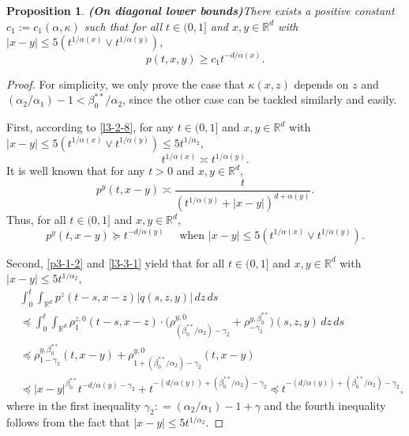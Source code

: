 \documentclass[a4paper,11pt]{amsart}
\renewcommand{\le}{\leqslant}
\renewcommand{\ge}{\geqslant}
\newcommand{\R}{\mathds R}
\newcommand{\B}{\beta}
\newcommand{\p}{\preceq}
\newcommand{\K}{\kappa}
\newcommand{\A}{\alpha}
\newcommand{\G}{\gamma}
\newtheorem{proposition}[theorem]{Proposition}
\theoremstyle{definition}
\begin{document}
\begin{proposition}{\bf (On diagonal lower bounds)}\label{p4-3}
There exists a positive constant $c_1:=c_1(\A,\K)$ such that for all $t \in (0,1]$ and $x,y \in \R^d$ with $|x-y|\le 5
(t^{{1}/{\A(x)}}\vee t^{{1}/{\A(y)}})$,
\begin{equation}\label{p4-3-1}
p(t,x,y) \ge c_1t^{-{d}/{\A(x)}}.
\end{equation}
\end{proposition}
\begin{proof}
For simplicity, we only prove the case that $\K(x,z)$ depends on $z$ and $({\A_2}/{\A_1})-1<\B_0^{**}/{\A_2}$, since the other case can be
tackled similarly and easily.

First, according to \eqref{l3-2-8}, for any $t\in(0,1]$ and $x,y\in\R^d$ with $|x-y|\le 5
(t^{{1}/{\A(x)}}\vee t^{{1}/{\A(y)}})\le 5t^{{1}/{\A_2}}$,
\begin{equation}\label{p4-3-2}
t^{{1}/{\A(x)}}\asymp t^{{1}/{\A(y)}}.
\end{equation}
It is well known that for any $t>0$ and $x,y\in \R^d$, $$p^y(t,x-y)\asymp \frac{t}{(t^{{1}/{\A(y)}}+|x-y|)^{d+\A(y)}}.$$
Thus, for all $t\in (0,1]$ and $x,y\in\R^d$,
\begin{equation}\label{p4-3-3}
p^y(t,x-y)\succeq t^{-{d}/{\A(y)}}
\quad\textrm{ when }|x-y|\le 5(t^{{1}/{\A(x)}}\vee t^{{1}/{\A(y)}}).
\end{equation}

Second, \eqref{p3-1-2} and \eqref{l3-3-1}  yield that for all $t\in (0,1]$ and $x,y\in\R^d$ with $|x-y|\le 5t^{{1}/{\A_2}}$,
\begin{equation}\label{p4-3-4}
\begin{split}
&\int_0^t \int_{\R^d}
p^z(t-s,x-z)|q(s,z,y)|\,dz\,ds\\
&\p\int_0^t \int_{\R^d}\rho^{z,0}_1(t-s,x-z)
\cdot\Big(\rho^{y,0}_{({\B_0^{**}}/{\A_2})-\G_2 }+\rho^{y,\B_0^{**}}_{-\G_2 }\Big)(s,z,y)\,dz\,ds\\
&\p \rho^{y,\B_0^{**}}_{1-\G_2 }(t,x-y)+\rho^{y,0}_{1+({\B_0^{**}}/{\A_2})-\G_2 }(t,x-y)\\
& \p
|x-y|^{\B_0^{**}}t^{-{d}/{\A(y)}-\G_2 }+t^{-({d}/{\A(y)})+({\B_0^{**}}/{\A_2})-\G_2 }\p t^{-({d}/{\A(y)})+({\B_0^{**}}/{\A_2})-\G_2 },
\end{split}
\end{equation}
where in the first inequality $\G_2: =({\A_2}/{\A_1})-1+\G$ and the fourth inequality
follows from the fact that $|x-y|\le 5t^{{1}/{\A_2}}$.


\end{proof}
\end{document}
